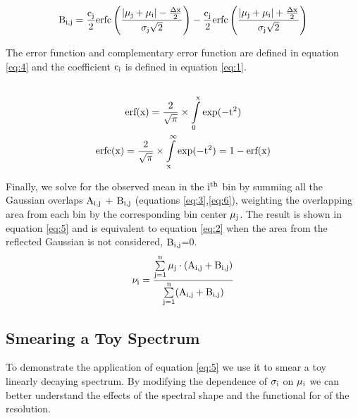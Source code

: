 \begin{equation}
\rm B_{i,j}=
\rm \frac{c_j}{2} erfc\left(\frac{|\mu_j+\mu_i| - \frac{\Delta x}{2}}{\sigma _j\sqrt{2}} \right) - 
\rm \frac{c_j}{2} erfc\left(\frac{|\mu_j+\mu_i| + \frac{\Delta x}{2}}{\sigma _j\sqrt{2}} \right)
\label{eq:6}
\end{equation}

The error function and complementary error function are defined in equation \ref{eq:4} and the coefficient $\rm c_i$ is defined in equation \ref{eq:1}.
\begin{multline}
\\ \rm erf(x)=\frac{2}{\sqrt{\pi}} \times \int\limits_{0}^{x} exp(-t^2)\\
\rm erfc(x)=\frac{2}{\sqrt{\pi}} \times \int\limits_{x}^{\infty} exp(-t^2) = 1 - erf(x)\\
\label{eq:4}
\end{multline}

Finally, we solve for the observed mean in the $\rm i^{th}$ bin by summing all the Gaussian overlaps $\rm A_{i,j}$ + $\rm B_{i,j}$ (equations \ref{eq:3},\ref{eq:6}), weighting the overlapping area from each bin by the corresponding bin center $\rm \mu_j$. The result is shown in equation \ref{eq:5} and is equivalent to equation \ref{eq:2} when the area from the reflected Gaussian is not considered, $\rm B_{i,j}$=0.
\begin{equation}
\rm \Large \nu_i =  \frac{\sum\limits_{j=1}^{n}\mu_j\cdot (A_{i,j}+B_{i,j})}{\sum\limits_{j=1}^{n} (A_{i,j}+B_{i,j})}
\label{eq:5}
\end{equation}

\subsection{Smearing a Toy Spectrum}

To demonstrate the application of equation \ref{eq:5} we use it to smear a toy linearly decaying spectrum. By modifying the dependence of $\rm \sigma_i$ on $\rm \mu_i$ we can better understand the effects of the spectral shape and the functional for of the resolution.

